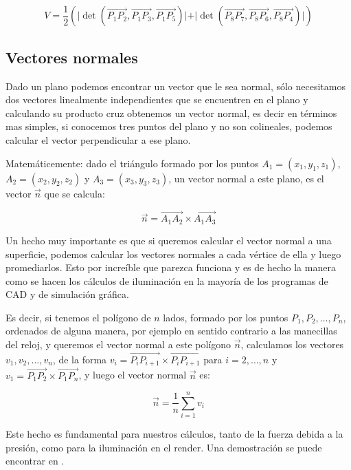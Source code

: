 \begin{equation}
\label{ecuacionVolumen} 
 V =  \frac{1}{2} \left( \vert \det ( \overrightarrow{P_1 P_2}, \overrightarrow{P_1 P_3}, \overrightarrow{P_1 P_5} ) \vert + \vert \det (\overrightarrow{P_8 P_7}, \overrightarrow{P_8 P_6}, \overrightarrow{P_8 P_4} ) \vert \right) 
\end{equation}

\subsection{Vectores normales}
Dado un plano podemos encontrar un vector que le sea normal, sólo necesitamos dos vectores linealmente independientes que se encuentren en el plano y calculando su producto cruz obtenemos un vector normal, es decir en términos mas simples, si conocemos tres puntos del plano y no son colineales, podemos calcular el vector perpendicular a ese plano.

Matemáticemente: dado el triángulo formado por los puntos $A_1 = (x_1, y_1, z_1)$, $A_2 = (x_2, y_2, z_2)$ y $A_3 = (x_3, y_3, z_3)$, un vector normal a este plano, es el vector $\vec{n}$ que se calcula:

$$ \vec{n} = \overrightarrow{A_1 A_2} \times \overrightarrow{A_1 A_3}$$

Un hecho muy importante es que si queremos calcular el vector normal a una superficie, podemos calcular los vectores normales a cada vértice de ella y luego promediarlos. Esto por increíble que parezca funciona y es de hecho la manera como se hacen los cálculos de iluminación en la mayoría de los programas de CAD y de simulación gráfica.

Es decir, si tenemos el polígono de $n$ lados, formado por los puntos $P_1, P_2, \ldots, P_n$, ordenados de alguna manera, por ejemplo en sentido contrario a las manecillas del reloj, y queremos el vector normal a este polígono $\vec{n}$, calculamos los vectores $ v_1, v_2, \ldots , v_n $, de la forma $v_i = \overrightarrow{P_i P_{i + 1}} \times \overrightarrow{P_i P_{i + 1}} $ para $i = 2, \ldots, n$ y $v_1 = \overrightarrow{P_1 P_2} \times \overrightarrow{P_1 P_n}$, y luego el vector normal $\vec{n}$ es:

\begin{equation}
\label{formulaVecNormal} 
\vec{n} = \frac{1}{n} \sum_{i=1}^{n} v_i
\end{equation}

Este hecho es fundamental para nuestros cálculos, tanto de la fuerza debida a la presión, como para la iluminación en el render. Una demostración se puede encontrar en \cite{GeometriaParaCAD}.

